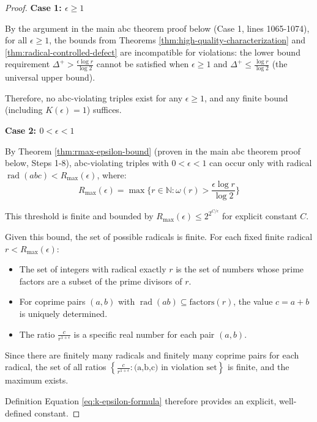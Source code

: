 \begin{proof}

\noindent \textbf{Case 1: $\epsilon \geq 1$}

By the argument in the main abc theorem proof below (Case 1, lines 1065-1074), for all $\epsilon \geq 1$, the bounds from Theorems \ref{thm:high-quality-characterization} and \ref{thm:radical-controlled-defect} are incompatible for violations: the lower bound requirement $\Delta^{+} > \frac{\epsilon \log r}{\log 2}$ cannot be satisfied when $\epsilon \geq 1$ and $\Delta^{+} \leq \frac{\log r}{\log 2}$ (the universal upper bound).

Therefore, no abc-violating triples exist for any $\epsilon \geq 1$, and any finite bound (including $K(\epsilon) = 1$) suffices.

\noindent \textbf{Case 2: $0 < \epsilon < 1$}

By Theorem \ref{thm:rmax-epsilon-bound} (proven in the main abc theorem proof below, Steps 1-8), abc-violating triples with $0 < \epsilon < 1$ can occur only with radical $\operatorname{rad}(abc) < R_{\max}(\epsilon)$, where:
\begin{equation}
R_{\max}(\epsilon) = \max \{ r \in \mathbb{N} : \omega(r) > \frac{\epsilon \log r}{\log 2} \}
\end{equation}

This threshold is finite and bounded by $R_{\max}(\epsilon) \leq 2^{2^{C/\epsilon}}$ for explicit constant $C$.

Given this bound, the set of possible radicals is finite. For each fixed finite radical $r < R_{\max}(\epsilon)$:
\begin{itemize}
\item The set of integers with radical exactly $r$ is the set of numbers whose prime factors are a subset of the prime divisors of $r$.
\item For coprime pairs $(a,b)$ with $\operatorname{rad}(ab) \subseteq \text{factors}(r)$, the value $c = a + b$ is uniquely determined.
\item The ratio $\frac{c}{r^{1+\epsilon}}$ is a specific real number for each pair $(a,b)$.
\end{itemize}

Since there are finitely many radicals and finitely many coprime pairs for each radical, the set of all ratios $\left\{\frac{c}{r^{1+\epsilon}} : \text{(a,b,c) in violation set}\right\}$ is finite, and the maximum exists.

Definition Equation \eqref{eq:k-epsilon-formula} therefore provides an explicit, well-defined constant.

\end{proof}

